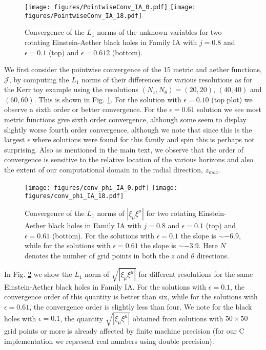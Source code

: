 \documentclass[12pt]{article}
\numberwithin{equation}{section}
\begin{document}
\begin{figure}[t]
\centering
\texttt{[image: figures/PointwiseConv\_IA\_0.pdf]}
\texttt{[image: figures/PointwiseConv\_IA\_18.pdf]}
\caption{Convergence of the $L_1$ norms of the unknown variables for two rotating Einstein-Aether black holes in Family IA with $j=0.8$ and $\epsilon=0.1$ (top) and  $\epsilon=0.612$ (bottom). }
\label{fig:pointwise_ae}
\end{figure}

We first consider the pointwise convergence of the 15 metric and aether functions, $\mathcal{J}$, by computing the $L_1$ norms of their differences for various resolutions as for the Kerr toy example using the resolutions $(N_z,N_\theta) = (20,20)$, $(40,40)$ and $(60,60)$. This is shown in Fig. \ref{fig:pointwise_ae}. 
For the solution with $\epsilon=0.10$ (top plot) we observe a sixth order or better convergence. For the $\epsilon=0.61$ solution we see most metric functions give sixth order convergence, although some seem to display slightly worse fourth order convergence, although we note that since this is the largest $\epsilon$ where solutions were found for this family and spin this is perhaps not surprising.
Also as mentioned in the main text, we observe that the order of convergence is sensitive to the relative location of the various horizons and also the extent of our computational domain in the radial direction, $z_{max}$. 




\begin{figure}[t]
\centering
\texttt{[image: figures/conv\_phi\_IA\_0.pdf]}
\texttt{[image: figures/conv\_phi\_IA\_18.pdf]}
\caption{Convergence of the $L_1$ norms of $|\xi_\mu\xi^\mu|$ for two rotating Einstein-Aether black holes in Family IA with $j=0.8$ and $\epsilon=0.1$ (top) and  $\epsilon=0.61$ (bottom). For the solutions with $\epsilon=0.1$ the slope is $\sim-6.9$, while for the solutions with $\epsilon=0.61$ the slope is $\sim-3.9$. Here $N$ denotes the number of grid points in both the $z$ and $\theta$ directions.}
\label{fig:pointwise_phi_ae}
\end{figure}

In Fig. \ref{fig:pointwise_phi_ae} we show the $L_1$ norm of $\sqrt{|\xi_\mu\xi^\mu|}$ for different resolutions for the same Einstein-Aether black holes in Family IA. For the solutions with $\epsilon=0.1$, the convergence order of this quantity is better than six, while for the solutions with $\epsilon=0.61$, the convergence order is slightly less than four. We note for the black holes with $\epsilon=0.1$, the quantity $\sqrt{|\xi_\mu\xi^\mu|}$ obtained from solutions with $50\times50$ grid points or more is already affected by finite machine precision (for our C implementation we represent real numbers using double precision). 
\end{document}

